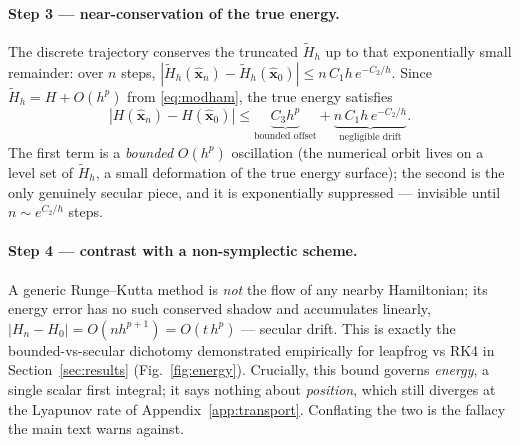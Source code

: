 \documentclass[11pt]{article}
\theoremstyle{definition}
\begin{document}
\paragraph{Step 3 --- near-conservation of the true energy.}
The discrete trajectory conserves the truncated $\tilde H_h$ up to that
exponentially small remainder: over $n$ steps,
$|\tilde H_h(\hat{\mathbf x}_n) - \tilde H_h(\hat{\mathbf x}_0)|
\le n\,C_1 h\,e^{-C_2/h}$. Since $\tilde H_h = H + O(h^p)$ from
\eqref{eq:modham}, the true energy satisfies
\begin{equation}
|H(\hat{\mathbf x}_n) - H(\hat{\mathbf x}_0)|
\le \underbrace{C_3 h^{p}}_{\text{bounded offset}}
+ \underbrace{n\,C_1 h\,e^{-C_2/h}}_{\text{negligible drift}} .
\end{equation}
The first term is a \emph{bounded} $O(h^p)$ oscillation (the numerical orbit
lives on a level set of $\tilde H_h$, a small deformation of the true energy
surface); the second is the only genuinely secular piece, and it is
exponentially suppressed --- invisible until $n \sim e^{C_2/h}$ steps.

\paragraph{Step 4 --- contrast with a non-symplectic scheme.}
A generic Runge--Kutta method is \emph{not} the flow of any nearby Hamiltonian;
its energy error has no such conserved shadow and accumulates linearly,
$|H_n - H_0| = O(n h^{p+1}) = O(t\,h^{p})$ --- secular drift. This is exactly
the bounded-vs-secular dichotomy demonstrated empirically for leapfrog vs RK4 in
Section~\ref{sec:results} (Fig.~\ref{fig:energy}). Crucially, this bound governs
\emph{energy}, a single scalar first integral; it says nothing about
\emph{position}, which still diverges at the Lyapunov rate of
Appendix~\ref{app:transport}. Conflating the two is the fallacy the main text
warns against.
\end{document}
